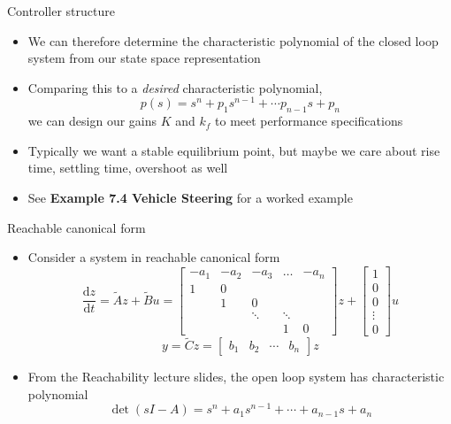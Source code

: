 \documentclass[10pt]{beamer-control}
\begin{document}
\begin{frame}{Controller structure}
	\begin{itemize}
		\item We can therefore determine the characteristic polynomial of the closed loop system from our state space representation
		\item Comparing this to a \textit{desired} characteristic polynomial,
		\begin{equation}
			p(s) = s^n + p_1 s^{n-1} + \cdots p_{n-1} s + p_n
		\end{equation} 
		we can design our gains $K$ and $k_f$ to meet performance specifications 
		\item Typically we want a stable equilibrium point, but maybe we care about rise time, settling time, overshoot as well 
		\item See \textbf{Example 7.4 Vehicle Steering} for a worked example
	\end{itemize}
\end{frame}


\begin{frame}{Reachable canonical form}
\begin{itemize}
\item Consider a system in reachable canonical form
\begin{equation}
	\frac{\mathrm{d} z}{\mathrm{d} t}=\tilde{A} z+\tilde{B} u=\begin{bmatrix}
		-a_1 & -a_2 & -a_3 & \ldots & -a_n \\
		1 & 0 & & &  \\
		& 1 & 0 & & \\
		& & \ddots & \ddots & \\
		& & & 1 & 0
	\end{bmatrix} z+\begin{bmatrix}
		1 \\
		0 \\
		0 \\
		\vdots \\
		0
	\end{bmatrix} u
\end{equation}
\begin{equation}
	y=\tilde{C} z=\begin{bmatrix}
		b_1 & b_2 & \cdots & b_n
	\end{bmatrix}z
\end{equation}
\item From the \alert{Reachability} lecture slides, the open loop system has characteristic polynomial
\begin{equation}
	\operatorname{det}(sI-A) = s^n+a_1s^{n-1}+\cdots + a_{n-1}s+a_n
\end{equation}
\end{itemize}
\end{frame}
\end{document}

